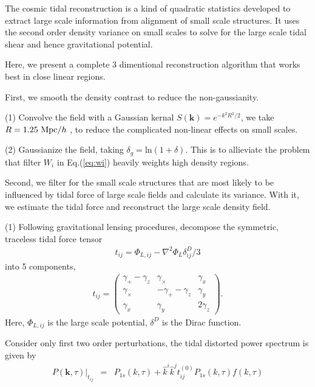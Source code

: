 The cosmic tidal reconstruction is a kind of quadratic statistics developed to extract large scale information from alignment of small scale structures.
It uses the second order density variance on small scales to solve for the large scale tidal shear and hence gravitational potential.

Here, we present a complete 3 dimentional reconstruction algorithm that works best in close linear regions.

First, we smooth the density contrast to reduce the non-gaussianity.

(1) Convolve the field with a Gaussian kernal
$S(\bm{k})=e^{-k^2R^2/2}$, 
we take $R=1.25\ \mathrm{Mpc}/h$ \cite{2012:pen},
to reduce the complicated non-linear effects on small scales.

(2) Gaussianize the field, taking 
$\delta_g=\mathrm{ln}(1+\delta)$. 
This is to allieviate the problem that filter $W_i$ in Eq.(\ref{eq:wi}) heavily weights high density regions.


Second, we filter for the small scale structures that are most likely to be influenced by tidal force of large scale fields and calculate its variance. 
With it, we estimate the tidal force and reconstruct the large scale density field.

(1) Following gravitational lensing procedures, decompose the symmetric, traceless tidal force tensor 
\begin{eqnarray}
\label{eq:tij}
t_{ij}=\Phi_{L,ij}-\nabla^2\Phi_L\delta^D_{ij}/3
\end{eqnarray}
into 5 components, 
\begin{eqnarray}
t_{ij}=\left( \begin{array}{ccc}
\gamma_{+}-\gamma_{z} & \gamma_{\times} & \gamma_{x}\\
\gamma_{\times} & -\gamma_{+}-\gamma_{z} & \gamma_{y}\\
\gamma_{x} & \gamma_{y} & 2\gamma_z
\end{array} \right).
\end{eqnarray}
Here, $\Phi_{L,ij}$ is the large scale potential, 
$\delta^D$ is the Dirac function.

Consider only first two order perturbations, 
the tidal distorted power spectrum \cite{2015:zhu} is given by
\begin{eqnarray}
\label{eq:powerdistort}
P(\bm{k},\tau)|_{t_{ij}}&=&P_{1s}(k,\tau)+
\hat{k}^i\hat{k}^jt_{ij}^{(0)}P_{1s}(k,\tau)f(k,\tau)
\end{eqnarray}

